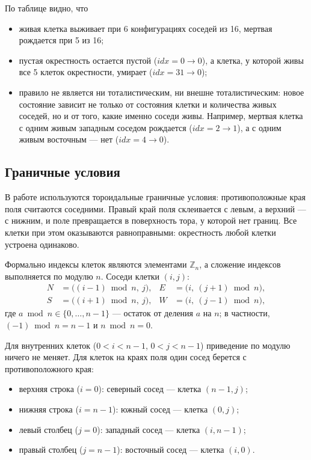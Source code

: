 \documentclass[a4paper,14pt]{extarticle}
\begin{document}
По таблице видно, что
\begin{itemize}
	\item живая клетка выживает при 6 конфигурациях соседей из 16, мертвая рождается при 5 из 16;
	\item пустая окрестность остается пустой ($idx = 0 \to 0$), а клетка, у которой живы все 5 клеток окрестности, умирает ($idx = 31 \to 0$);
	\item правило не является ни тоталистическим, ни внешне тоталистическим: новое состояние зависит не только от состояния клетки и количества живых соседей, но и от того, какие именно соседи живы. Например, мертвая клетка с одним живым западным соседом рождается ($idx = 2 \to 1$), а с одним живым восточным --- нет ($idx = 4 \to 0$).
\end{itemize}

\subsection{Граничные условия}
\label{sec:torus}

В работе используются тороидальные граничные условия: противоположные края поля считаются соседними. Правый край поля склеивается с левым, а верхний --- с нижним, и поле превращается в поверхность тора, у которой нет границ. Все клетки при этом оказываются равноправными: окрестность любой клетки устроена одинаково.

Формально индексы клеток являются элементами $\mathbb{Z}_n$, а сложение индексов выполняется по модулю $n$. Соседи клетки $(i, j)$:
\begin{align*}
	N &= \bigl((i-1) \bmod n,\ j\bigr), & E &= \bigl(i,\ (j+1) \bmod n\bigr),\\
	S &= \bigl((i+1) \bmod n,\ j\bigr), & W &= \bigl(i,\ (j-1) \bmod n\bigr),
\end{align*}
где $a \bmod n \in \{0, \dots, n-1\}$ --- остаток от деления $a$ на $n$; в частности, $(-1) \bmod n = n-1$ и $n \bmod n = 0$.

Для внутренних клеток ($0 < i < n-1$, $0 < j < n-1$) приведение по модулю ничего не меняет. Для клеток на краях поля один сосед берется с противоположного края:
\begin{itemize}
	\item верхняя строка ($i = 0$): северный сосед --- клетка $(n-1, j)$;
	\item нижняя строка ($i = n-1$): южный сосед --- клетка $(0, j)$;
	\item левый столбец ($j = 0$): западный сосед --- клетка $(i, n-1)$;
	\item правый столбец ($j = n-1$): восточный сосед --- клетка $(i, 0)$.
\end{itemize}
\end{document}
